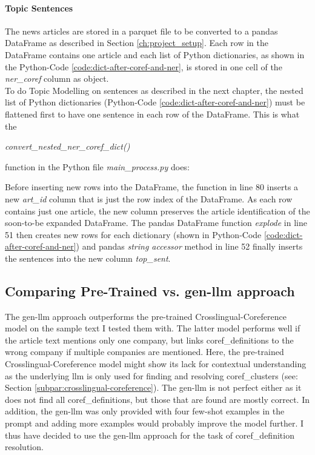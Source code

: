 \paragraph{Topic Sentences}\label{par:topic-sents}
The news articles are stored in a parquet file to be converted to a pandas DataFrame as described in Section \ref{ch:project_setup}.
Each row in the DataFrame contains one article and each list of Python dictionaries, as shown in the Python-Code \ref{code:dict-after-coref-and-ner}, is stored in one cell of the \emph{ner\_coref} column as object.\\

To do Topic Modelling on sentences as described in the next chapter, the nested list of Python dictionaries (Python-Code \ref{code:dict-after-coref-and-ner}) must be flattened first to have one sentence in each row of the DataFrame.
This is what the
\begin{center}
\emph{convert\_nested\_ner\_coref\_dict()}
\end{center}
function in the Python file \emph{main\_process.py} does:


Before inserting new rows into the DataFrame, the function in line 80 inserts a new \emph{art\_id} column that is just the row index of the DataFrame.
As each row contains just one article, the new column preserves the article identification of the soon-to-be expanded DataFrame.
The pandas DataFrame function \emph{explode} in line 51 then creates new rows for each dictionary (shown in Python-Code \ref{code:dict-after-coref-and-ner})
and pandas \emph{string accessor} method in line 52 finally inserts the sentences into the new column \emph{top\_sent}.

\subsection{Comparing Pre-Trained vs. \gls{gen-llm} approach}
The \gls{gen-llm} approach outperforms the pre-trained Crosslingual-Coreference model \cite{xxCoref} on the sample text I tested them with.
The latter model performs well if the article text mentions only one company, but links \glspl{coref_definition} to the wrong company if multiple companies are mentioned.
Here, the pre-trained Crosslingual-Coreference model \cite{xxCoref} might show its lack for contextual understanding as the underlying \gls{llm} is only used for finding and resolving \glspl{coref_cluster} (see: Section \ref{subpar:crosslingual-coreference}).
The \gls{gen-llm} is not perfect either as it does not find all \glspl{coref_definition}, but those that are found are mostly correct.
In addition, the \gls{gen-llm} was only provided with four few-shot examples in the \gls{prompt} and adding more examples would probably improve the model further.
I thus have decided to use the \gls{gen-llm} approach for the task of \gls{coref_definition} resolution.

